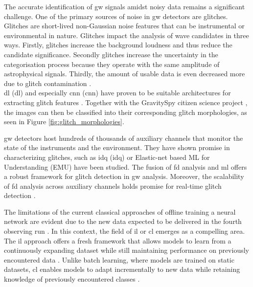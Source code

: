 The accurate identification of \acrshort{gw} signals amidst noisy data remains a significant challenge. One of the primary sources of noise in \acrshort{gw} detectors are glitches. 
Glitches are short-lived non-Gaussian noise features that can be instrumental or environmental in nature. Glitches impact the analysis of wave candidates in three ways. Firstly, glitches increase the background loudness and thus reduce the candidate significance. Secondly glitches increase the uncertainty in the categorisation process because they operate with the same amplitude of astrophysical signals. Thirdly, the amount of usable data is even decreased more due to glitch contamination \citep{zevin2017gravity, cuoco2020enhancing}. \\
\acrlong{dl} (\acrshort{dl}) and especially \acrlong{cnn} (\acrshort{cnn}) have proven to be suitable architectures for extracting glitch features \citep{george2017deep,glanzer2023data,fernandes2023convolutional}. Together with the GravitySpy citizen science project \citep{bahaadini2018machine, zevin2017gravity}, the images can then be classified into their corresponding glitch morphologies, as seen in Figure \ref{fig:glitch_morphologies}.

\acrshort{gw} detectors host hundreds of thousands of auxiliary channels that monitor the state of the instruments and the environment. They have shown promise in characterizing glitches, such as \acrlong{idq} (\acrshort{idq}) \citep{essick2020idq,davis2022detector} or Elastic-net based ML for Understanding (EMU) \citep{colgan2020efficient} have been studied. The fusion of \acrfull{fd} analysis and \acrshort{ml} offers a robust framework for glitch detection in \acrshort{gw} analysis. Moreover, the scalability of \acrshort{fd} analysis across auxiliary channels holds promise for real-time glitch detection \citep{colgan2020efficient, benedetto2023ai}.

The limitations of the current classical approaches of offline training a neural network are evident due to the new data expected to be delivered in the fourth observing run \citep{wu2024advancing}. In this context, the field of \acrfull{il} or \acrshort{cl} emerges as a compelling area. The \acrshort{il} approach offers a fresh framework that allows models to learn from a continuously expanding dataset while still maintaining performance on previously encountered data \citep{van2022three, qu2021recent, de2021continual}.
Unlike batch learning, where models are trained on static datasets, \acrshort{cl} enables models to adapt incrementally to new data while retaining knowledge of previously encountered classes \citep{kirkpatrick2017overcoming}. 

